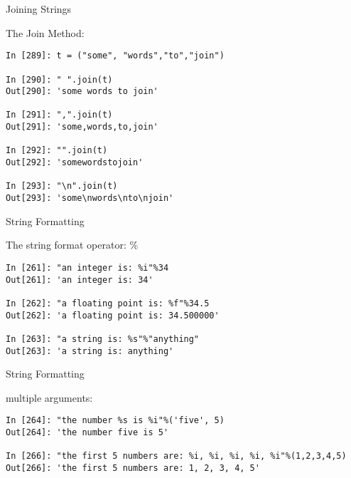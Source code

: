 \documentclass{beamer}
\begin{document}
\begin{frame}[fragile]{Joining Strings}

{\Large The Join Method:}

\vfill
\begin{verbatim}
In [289]: t = ("some", "words","to","join")

In [290]: " ".join(t)
Out[290]: 'some words to join'

In [291]: ",".join(t)
Out[291]: 'some,words,to,join'

In [292]: "".join(t)
Out[292]: 'somewordstojoin'

In [293]: "\n".join(t)
Out[293]: 'some\nwords\nto\njoin'

\end{verbatim}

\vfill
\end{frame} 




\begin{frame}[fragile]{String Formatting}

{\Large The string format operator: \%}

\begin{verbatim}
In [261]: "an integer is: %i"%34
Out[261]: 'an integer is: 34'

In [262]: "a floating point is: %f"%34.5
Out[262]: 'a floating point is: 34.500000'

In [263]: "a string is: %s"%"anything"
Out[263]: 'a string is: anything'
\end{verbatim}

\end{frame} 

\begin{frame}[fragile]{String Formatting}

{\Large multiple arguments:}

\begin{verbatim}
In [264]: "the number %s is %i"%('five', 5)
Out[264]: 'the number five is 5'

In [266]: "the first 5 numbers are: %i, %i, %i, %i, %i"%(1,2,3,4,5)
Out[266]: 'the first 5 numbers are: 1, 2, 3, 4, 5'

\end{verbatim}

\end{frame} 
\end{document}
